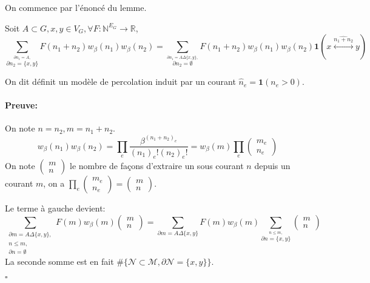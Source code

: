 \documentclass[a4paper,12pt]{report}
\newenvironment{preuve}{\paragraph{Preuve:}}{\hfill$\square$}
\begin{document}
On commence par l'énoncé du lemme.
\begin{thm}
Soit $A\subset G, x,y \in V_G, \forall F: \mathbb{N}^{E_G} \rightarrow \mathbb{R}$,
$$\sum_{\overset{\partial n_1 = A,}{\partial n_2 = \{x,y\}}} F(n_1+n_2)w_\beta(n_1)w_\beta(n_2) = \sum_{\overset{\partial n_1 = A \Delta\{x,y\},}{\partial n_2 = \emptyset}}F(n_1+n_2)w_\beta(n_1)w_\beta(n_2)\mathbf{1}(x\overset{\widehat{n_1+n_2}}{\longleftrightarrow}y)
$$
\end{thm}
On dit définit un modèle de percolation induit par un courant $\hat{n}_e = \mathbf{1}(n_e>0)$.
\begin{preuve}
On note $n = n_2, m = n_1+n_2$.
$$w_\beta(n_1)w_\beta(n_2) = \prod_{e}\frac{\beta^{(n_1+n_2)_e}}{(n_1)_e!(n_2)_e!} = w_\beta(m) \prod_e\left(\begin{array}{c} m_e \\ n_e \end{array} \right)
$$
On note $\left(\begin{array}{c} m \\ n \end{array} \right)$ le nombre de façons d'extraire un sous courant $n$ depuis un courant $m$, on a $\prod_e\left(\begin{array}{c} m_e \\ n_e \end{array} \right) = \left(\begin{array}{c} m \\ n \end{array} \right)$.

Le terme à gauche devient:
$$
\sum_{\begin{array}{c}
\partial m = A\Delta\{x,y\},\\
n\leqslant m, \\
\partial n = \emptyset
\end{array}} F(m)w_\beta(m) \left(\begin{array}{c} m \\ n
\end{array} \right)= \sum_{\partial m = A\Delta\{x,y\}}F(m)w_\beta(m)\sum_{\overset{n\leqslant m,}{\partial n = \{x,y\}}}\left(\begin{array}{c} m \\ n
\end{array} \right)
$$
La seconde somme est en fait $\#\big\{ \mathcal{N}\subset \mathcal{M},\partial \mathcal{N} = \{x,y\}\big\}$.


\end{preuve}
\end{document}
